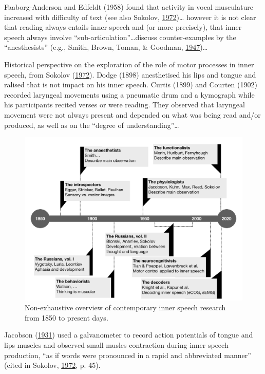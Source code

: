\documentclass[a4paper,12pt,twoside,openright,oldfontcommands]{memoir}
\begin{document}
Faaborg-Anderson and Edfeldt (1958) found that activity in vocal musculature increased with difficulty of text (see also Sokolov, \protect\hyperlink{ref-sokolov_inner_1972}{1972})\ldots{} however it is not clear that reading always entails inner speech and (or more precisely), that inner speech always involve \enquote{sub-articulation}\ldots discuss counter-examples by the \enquote{anesthesists} (e.g., Smith, Brown, Toman, \& Goodman, \protect\hyperlink{ref-smith_lack_1947}{1947})\ldots{}

Historical perspective on the exploration of the role of motor processes in inner speech, from Sokolov (\protect\hyperlink{ref-sokolov_inner_1972}{1972}). Dodge (1898) anesthetised his lips and tongue and ralised that is not impact on his inner speech. Curtis (1899) and Courten (1902) recorded laryngeal movements using a pneumatic drum and a kymograph while his participants recited verses or were reading. They observed that laryngeal movement were not always present and depended on what was being read and/or produced, as well as on the \enquote{degree of understanding}\ldots{}

\begin{figure}

{\centering \includegraphics[width=1\linewidth]{assets/timeline} 

}

\caption{Non-exhaustive overview of contemporary inner speech research from 1850 to present days.}\label{fig:timeline}
\end{figure}

Jacobson (\protect\hyperlink{ref-jacobson_electrical_1931}{1931}) used a galvanometer to record action potentials of tongue and lips muscles and observed small musles contraction during inner speech production, \enquote{as if words were pronounced in a rapid and abbreviated manner} (cited in Sokolov, \protect\hyperlink{ref-sokolov_inner_1972}{1972}, p. 45).
\end{document}
